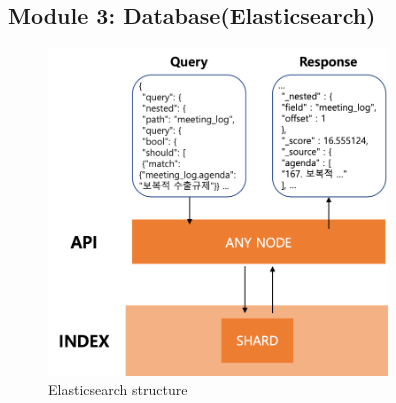 \documentclass[conference]{IEEEtran}
\begin{document}
  \subsection{Module 3: Database(Elasticsearch)}
\begin{figure}[htbp]
\centerline{\includegraphics[width=90mm,scale=0.5]{fig/6_8.png}}
\caption{Elasticsearch structure}
\label{fig}
\end{figure}
\end{document}
